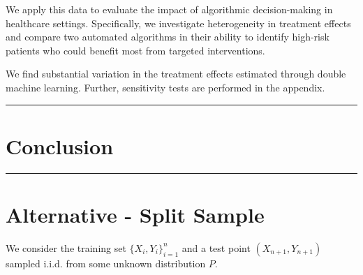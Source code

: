 \documentclass[
]{article}
\begin{document}
We apply this data to evaluate the impact of algorithmic decision-making
in healthcare settings. Specifically, we investigate heterogeneity in
treatment effects and compare two automated algorithms in their ability
to identify high-risk patients who could benefit most from targeted
interventions.

We find substantial variation in the treatment effects estimated through
double machine learning. Further, sensitivity tests are performed in the
appendix.

\begin{center}\rule{0.5\linewidth}{0.5pt}\end{center}

\section{Conclusion}\label{conclusion}

\begin{center}\rule{0.5\linewidth}{0.5pt}\end{center}

\section{Alternative - Split Sample}\label{alternative---split-sample}

We consider the training set \(\{ X_{i}, Y_{i} \}_{i=1}^n\) and a test
point \((X_{n+1}, Y_{n+1})\) sampled i.i.d. from some unknown
distribution \(P\).
\end{document}
